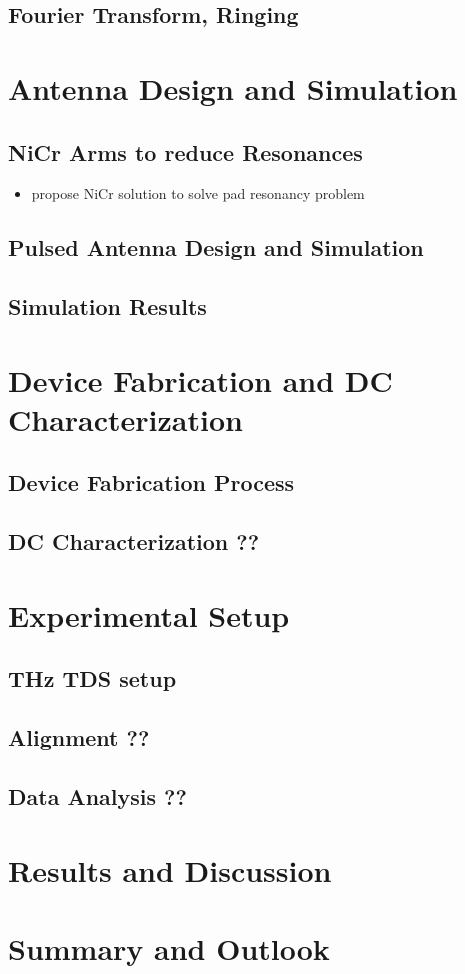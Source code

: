 \documentclass[
	german,%
	accentcolor=9c,%
	ruledheaders=section,%
	class=report,%
	thesis={type=bachelor},%
	fontsize=11pt,%
	parskip=half-,%
	custommargins=false,%
	marginpar=false,%
	BCOR=5mm,%
 	logofile=tools/logo-installation/TUDa-logos/tuda_logo.png,%
]{tudapub}
\begin{document}
\section{Fourier Transform, Ringing}

\chapter{Antenna Design and Simulation}
\section{NiCr Arms to reduce Resonances}
\begin{itemize}
	\item propose NiCr solution to solve pad resonancy problem 
\end{itemize}
\section{Pulsed Antenna Design and Simulation}




\section{Simulation Results}




\chapter{Device Fabrication and DC Characterization}
\section{Device Fabrication Process}
\section{DC Characterization ??}

\chapter{Experimental Setup}
\section{THz TDS setup}
\section{Alignment ??}
\section{Data Analysis ??}

\chapter{Results and Discussion}

\chapter{Summary and Outlook}

\printbibliography
\end{document}
